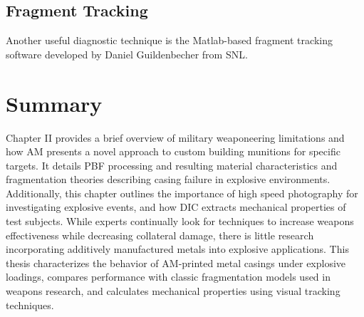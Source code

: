 
\subsection{Fragment Tracking} \label{sec:2_Fragment_tracking}

Another useful diagnostic technique is the Matlab-based fragment tracking software developed by Daniel Guildenbecher from \gls{SNL}.


%
\section{Summary} \label{sec:2_Summary}
Chapter II provides a brief overview of military weaponeering limitations and how \gls{AM} presents a novel approach to custom building munitions for specific targets. It details \gls{PBF} processing and resulting material characteristics and fragmentation theories describing casing failure in explosive environments. Additionally, this chapter outlines the importance of high speed photography for investigating explosive events, and how \gls{DIC} extracts mechanical properties of test subjects. 
While experts continually look for techniques to increase weapons effectiveness while decreasing collateral damage, there is little research incorporating additively manufactured metals into explosive applications. This thesis characterizes the behavior of \gls{AM}-printed metal casings under explosive loadings, compares performance with classic fragmentation models used in weapons research, and calculates mechanical properties using visual tracking techniques.







